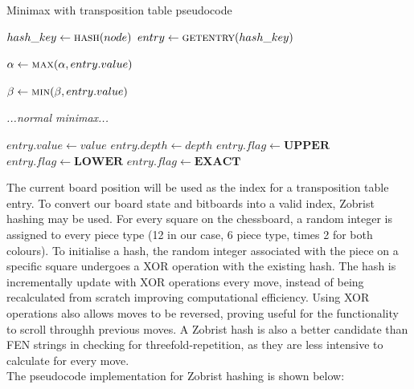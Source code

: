 \documentclass[../main/main.tex]{subfiles}
\begin{document}
\begin{algorithm}[H]
\caption{Minimax with transposition table pseudocode}
\begin{algorithmic}
        \State $hash\_key \gets \Call{hash}{node}$
        \State $entry \gets \Call{getentry}{hash\_key}$

        \bigskip

                \State {}
                \State $\alpha \gets \Call{max}{\alpha, entry.value}$

                \State $\beta \gets \Call{min}{\beta, entry.value}$
            \EndIf

            \If{$\alpha\geq\beta$}
                \State {}
            \EndIf
        \EndIf

        \bigskip

        \textit{...normal minimax...}

        \bigskip

        \State $entry.value \gets value$
        \State $entry.depth \gets depth$
            \State $entry.flag \gets \textbf{UPPER}$
            \State $entry.flag \gets \textbf{LOWER}$
        \Else
            \State $entry.flag \gets \textbf{EXACT}$
        \EndIf

        \bigskip

    \EndFunction
\end{algorithmic}
\end{algorithm}

The current board position will be used as the index for a transposition table entry. To convert our board state and bitboards into a valid index, Zobrist hashing may be used. For every square on the chessboard, a random integer is assigned to every piece type (12 in our case, 6 piece type, times 2 for both colours). To initialise a hash, the random integer associated with the piece on a specific square undergoes a XOR operation with the existing hash. The hash is incrementally update with XOR operations every move, instead of being recalculated from scratch improving computational efficiency. Using XOR operations also allows moves to be reversed, proving useful for the functionality to scroll throughh previous moves. A Zobrist hash is also a better candidate than FEN strings in checking for threefold-repetition, as they are less intensive to calculate for every move.
\\
The pseudocode implementation for Zobrist hashing is shown below:
\end{document}
